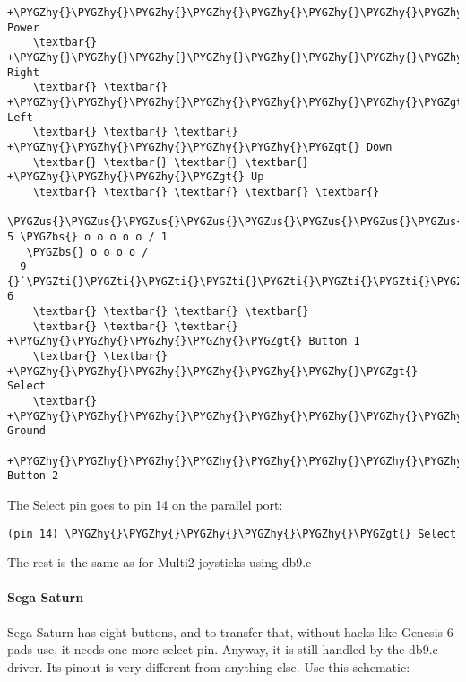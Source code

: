 \documentclass[a4paper,8pt,english]{sphinxmanual}
\def\PYGZbs{\char`\\}
\def\PYGZus{\char`\_}
\def\PYGZgt{\char`\>}
\def\PYGZhy{\char`\-}
\def\PYGZsq{\char`\'}
\def\PYGZti{\char`\~}
\renewcommand\PYGZsq{\textquotesingle}
\begin{document}
\begin{Verbatim}[commandchars=\\\{\}]
    +\PYGZhy{}\PYGZhy{}\PYGZhy{}\PYGZhy{}\PYGZhy{}\PYGZhy{}\PYGZhy{}\PYGZhy{}\PYGZhy{}\PYGZhy{}\PYGZhy{}\PYGZgt{} Power
    \textbar{} +\PYGZhy{}\PYGZhy{}\PYGZhy{}\PYGZhy{}\PYGZhy{}\PYGZhy{}\PYGZhy{}\PYGZhy{}\PYGZhy{}\PYGZgt{} Right
    \textbar{} \textbar{} +\PYGZhy{}\PYGZhy{}\PYGZhy{}\PYGZhy{}\PYGZhy{}\PYGZhy{}\PYGZhy{}\PYGZgt{} Left
    \textbar{} \textbar{} \textbar{} +\PYGZhy{}\PYGZhy{}\PYGZhy{}\PYGZhy{}\PYGZhy{}\PYGZgt{} Down
    \textbar{} \textbar{} \textbar{} \textbar{} +\PYGZhy{}\PYGZhy{}\PYGZhy{}\PYGZgt{} Up
    \textbar{} \textbar{} \textbar{} \textbar{} \textbar{}
  \PYGZus{}\PYGZus{}\PYGZus{}\PYGZus{}\PYGZus{}\PYGZus{}\PYGZus{}\PYGZus{}\PYGZus{}\PYGZus{}\PYGZus{}\PYGZus{}\PYGZus{}
5 \PYGZbs{} o o o o o / 1
   \PYGZbs{} o o o o /
  9 {}`\PYGZti{}\PYGZti{}\PYGZti{}\PYGZti{}\PYGZti{}\PYGZti{}\PYGZti{}\PYGZsq{} 6
    \textbar{} \textbar{} \textbar{} \textbar{}
    \textbar{} \textbar{} \textbar{} +\PYGZhy{}\PYGZhy{}\PYGZhy{}\PYGZhy{}\PYGZgt{} Button 1
    \textbar{} \textbar{} +\PYGZhy{}\PYGZhy{}\PYGZhy{}\PYGZhy{}\PYGZhy{}\PYGZhy{}\PYGZgt{} Select
    \textbar{} +\PYGZhy{}\PYGZhy{}\PYGZhy{}\PYGZhy{}\PYGZhy{}\PYGZhy{}\PYGZhy{}\PYGZhy{}\PYGZgt{} Ground
    +\PYGZhy{}\PYGZhy{}\PYGZhy{}\PYGZhy{}\PYGZhy{}\PYGZhy{}\PYGZhy{}\PYGZhy{}\PYGZhy{}\PYGZhy{}\PYGZgt{} Button 2
\end{Verbatim}

The Select pin goes to pin 14 on the parallel port:

\begin{Verbatim}[commandchars=\\\{\}]
(pin 14) \PYGZhy{}\PYGZhy{}\PYGZhy{}\PYGZhy{}\PYGZhy{}\PYGZgt{} Select
\end{Verbatim}

The rest is the same as for Multi2 joysticks using db9.c


\paragraph{Sega Saturn}
\label{input/devices/joystick-parport:sega-saturn}
Sega Saturn has eight buttons, and to transfer that, without hacks like
Genesis 6 pads use, it needs one more select pin. Anyway, it is still
handled by the db9.c driver. Its pinout is very different from anything
else.  Use this schematic:
\end{document}
